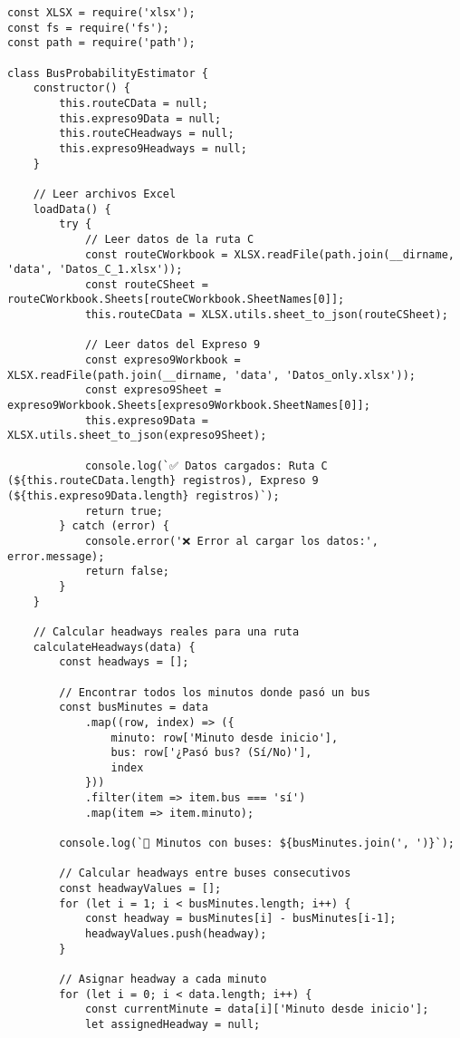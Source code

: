 \documentclass[12pt,a4paper]{article}
\begin{document}
\begin{lstlisting}[caption=bus-probability-estimator.js completo]
const XLSX = require('xlsx');
const fs = require('fs');
const path = require('path');

class BusProbabilityEstimator {
    constructor() {
        this.routeCData = null;
        this.expreso9Data = null;
        this.routeCHeadways = null;
        this.expreso9Headways = null;
    }

    // Leer archivos Excel
    loadData() {
        try {
            // Leer datos de la ruta C
            const routeCWorkbook = XLSX.readFile(path.join(__dirname, 'data', 'Datos_C_1.xlsx'));
            const routeCSheet = routeCWorkbook.Sheets[routeCWorkbook.SheetNames[0]];
            this.routeCData = XLSX.utils.sheet_to_json(routeCSheet);

            // Leer datos del Expreso 9
            const expreso9Workbook = XLSX.readFile(path.join(__dirname, 'data', 'Datos_only.xlsx'));
            const expreso9Sheet = expreso9Workbook.Sheets[expreso9Workbook.SheetNames[0]];
            this.expreso9Data = XLSX.utils.sheet_to_json(expreso9Sheet);

            console.log(`✅ Datos cargados: Ruta C (${this.routeCData.length} registros), Expreso 9 (${this.expreso9Data.length} registros)`);
            return true;
        } catch (error) {
            console.error('❌ Error al cargar los datos:', error.message);
            return false;
        }
    }

    // Calcular headways reales para una ruta
    calculateHeadways(data) {
        const headways = [];
        
        // Encontrar todos los minutos donde pasó un bus
        const busMinutes = data
            .map((row, index) => ({ 
                minuto: row['Minuto desde inicio'], 
                bus: row['¿Pasó bus? (Sí/No)'], 
                index 
            }))
            .filter(item => item.bus === 'sí')
            .map(item => item.minuto);

        console.log(`🚌 Minutos con buses: ${busMinutes.join(', ')}`);

        // Calcular headways entre buses consecutivos
        const headwayValues = [];
        for (let i = 1; i < busMinutes.length; i++) {
            const headway = busMinutes[i] - busMinutes[i-1];
            headwayValues.push(headway);
        }

        // Asignar headway a cada minuto
        for (let i = 0; i < data.length; i++) {
            const currentMinute = data[i]['Minuto desde inicio'];
            let assignedHeadway = null;


\end{lstlisting}
\end{document}
